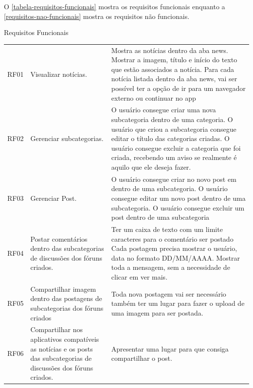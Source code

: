 
O  \autoref{tabela-requisitos-funcionais} mostra os requisitos funcionais  enquanto a \autoref{requisitos-nao-funcionais} mostra os requisitos não funcionais. 

\pagebreak

\begin{quadro}[htb]
	\centering
	\ABNTEXfontereduzida
	\caption[Requisitos Funcionais]{Requisitos Funcionais}
	\label{tabela-requisitos-funcionais}
\end{quadro}
\begin{longtable}{|p{2.0cm}|p{6.5cm}|p{6.5cm}|}
	\hline
	\thead{Código} & \thead{Requisito}  & \thead{Descrição} \\
	\hline
	RF01 &Visualizar notícias.  & Mostra as notícias dentro da aba news.
	Mostrar a imagem, título e início do texto que estão associados a notícia.
	Para cada notícia listada dentro da aba news, vai ser possível ter a opção de ir para um navegador externo ou continuar no app\\
	\hline
	RF02 & Gerenciar subcategorias. &
	O usuário consegue criar uma nova subcategoria dentro de uma categoria.
	O usuário que criou a subcategoria consegue editar o título das categorias criadas.
	O usuário consegue excluir a categoria que foi criada, recebendo um aviso se realmente é aquilo que ele deseja fazer.
	\\
	\hline
	RF03 & Gerenciar Post.   & O usuário consegue criar no novo post em dentro de uma subcategoria. 
	O usuário consegue editar um novo post dentro de uma subcategoria. 
	O usuário consegue excluir um post dentro de uma subcategoria\\
	\hline
	RF04 & Postar comentários dentro das subcategorias de discussões dos fóruns criados. & Ter um caixa de texto com um limite caracteres para o comentário ser postado
	Cada postagem precisa mostrar o usuário, data no formato DD/MM/AAAA.
	Mostrar toda a mensagem, sem a necessidade de clicar em ver mais.\\
	\hline
	RF05 & Compartilhar imagem dentro das postagens de subcategorias dos fóruns criados &
	Toda nova postagem vai ser necessário também ter um lugar para fazer o upload de uma imagem para ser postada.  \\
	\hline
	RF06 & Compartilhar nos aplicativos compatíveis as notícias e os posts das subcategorias de discussões dos fóruns criados.  & Apresentar uma lugar para que consiga compartilhar o post.

\end{longtable}
